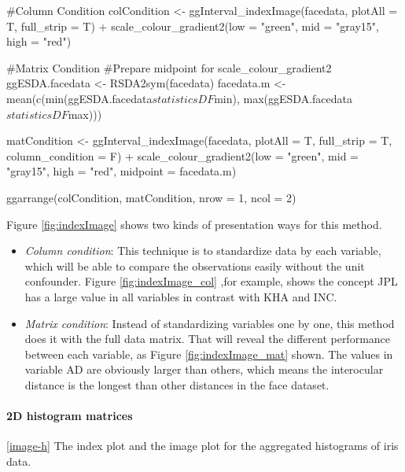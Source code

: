 \documentclass[article]{jss}
\begin{document}
\begin{CodeChunk}
\begin{CodeInput}
#Column Condition
colCondition <- ggInterval_indexImage(facedata, plotAll = T,
                                      full_strip = T) +
  scale_colour_gradient2(low = "green", mid = "gray15", high = "red")

#Matrix Condition
#Prepare midpoint for scale_colour_gradient2
ggESDA.facedata <- RSDA2sym(facedata)
facedata.m <- mean(c(min(ggESDA.facedata$statisticsDF$min),
                     max(ggESDA.facedata$statisticsDF$max)))
                                      
matCondition <- ggInterval_indexImage(facedata, plotAll = T,
                                      full_strip = T,
                                      column_condition = F) + 
  scale_colour_gradient2(low = "green", mid = "gray15", 
                         high = "red", midpoint = facedata.m)

ggarrange(colCondition, matCondition, nrow = 1, ncol = 2)
\end{CodeInput}
\end{CodeChunk}



Figure \ref{fig:indexImage} shows two kinds of presentation ways for this method.

\begin{itemize}
  \item \emph{Column condition}: This technique is to standardize data by each variable, which will be able to compare the observations easily without the unit confounder. Figure \ref{fig:indexImage_col} ,for example, shows the concept JPL has a large value in all variables in contrast with KHA and INC.
  \item \emph{Matrix condition}: Instead of standardizing variables one by one, this method does it with the full data matrix. That will reveal the different performance between each variable, as Figure \ref{fig:indexImage_mat} shown. The values in variable AD are obviously larger than others, which means the interocular distance is the longest than other distances in the face dataset.
\end{itemize}



\paragraph{2D histogram matrices}
\ref{image-h} The index plot and the image plot for the aggregated histograms 
of 
iris data.
\end{document}
